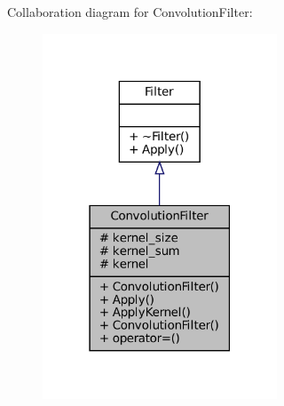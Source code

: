 Collaboration diagram for Convolution\+Filter\+:\nopagebreak
\begin{figure}[H]
\begin{center}
\leavevmode
\includegraphics[width=198pt]{classConvolutionFilter__coll__graph}
\end{center}
\end{figure}
